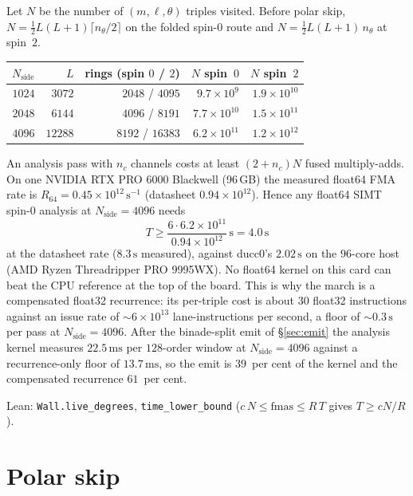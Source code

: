 \documentclass[11pt,a4paper]{article}
\numberwithin{equation}{section}
\begin{document}
Let $N$ be the number of $(m,\ell,\theta)$ triples visited.  Before polar
skip, $N=\tfrac12 L(L+1)\lceil n_\theta/2\rceil$ on the folded spin-$0$
route and $N=\tfrac12 L(L+1)\,n_\theta$ at spin~$2$.

\begin{center}
\small
\begin{tabular}{@{}rrrrr@{}}
\toprule
$N_{\mathrm{side}}$ & $L$ & rings (spin $0$ / $2$) & $N$ spin~$0$ & $N$ spin~$2$ \\
\midrule
$1024$ & $3072$  & $2048$ / $4095$  & $9.7\times 10^{9}$  & $1.9\times 10^{10}$ \\
$2048$ & $6144$  & $4096$ / $8191$  & $7.7\times 10^{10}$ & $1.5\times 10^{11}$ \\
$4096$ & $12288$ & $8192$ / $16383$ & $6.2\times 10^{11}$ & $1.2\times 10^{12}$ \\
\bottomrule
\end{tabular}
\end{center}

An analysis pass with $n_c$ channels costs at least $(2+n_c)N$ fused
multiply-adds.  On one NVIDIA RTX PRO 6000 Blackwell (96\,GB) the measured float64 FMA rate is
$R_{64}=0.45\times 10^{12}\,\mathrm{s}^{-1}$ (datasheet
$0.94\times 10^{12}$).  Hence any float64 SIMT spin-$0$ analysis at
$N_{\mathrm{side}}=4096$ needs
\begin{equation}
\label{eq:T}
T\ge\frac{6\cdot 6.2\times 10^{11}}{0.94\times 10^{12}}\,\mathrm{s}
   =4.0\,\mathrm{s}
\end{equation}
at the datasheet rate ($8.3\,\mathrm{s}$ measured), against ducc0's
$2.02\,\mathrm{s}$ on the 96-core host (AMD Ryzen Threadripper PRO 9995WX).  No float64 kernel on this card can beat
the CPU reference at the top of the board.  This is why the march is a
compensated float32 recurrence: its per-triple cost is about $30$ float32
instructions against an issue rate of $\sim 6\times 10^{13}$
lane-instructions per second, a floor of $\sim 0.3\,\mathrm{s}$ per pass at
$N_{\mathrm{side}}=4096$.  After the binade-split emit of \S\ref{sec:emit}
the analysis kernel measures $22.5\,\mathrm{ms}$ per $128$-order window at
$N_{\mathrm{side}}=4096$ against a recurrence-only floor of $13.7\,\mathrm{ms}$,
so the emit is $39$~per cent of the kernel and the compensated recurrence
$61$~per cent.

Lean: \texttt{Wall.live\_degrees}, \texttt{time\_lower\_bound}
($c\,N\le\mathrm{fmas}\le R\,T$ gives $T\ge cN/R$).

\section{Polar skip}
\label{sec:polar}
\end{document}
